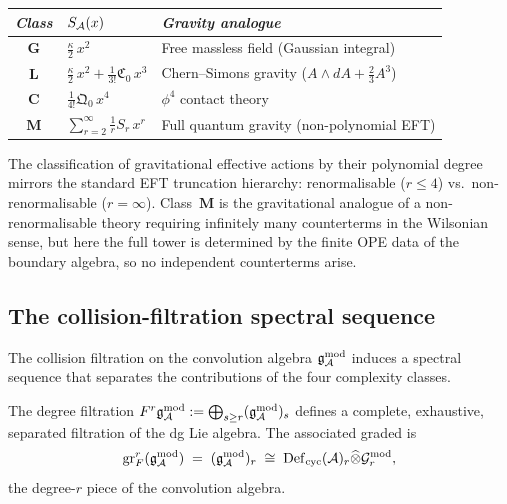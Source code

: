 \begin{remark}
\label{rem:thqg-four-gravity-theories}
\begin{center}
\small
\renewcommand{\arraystretch}{1.25}
\begin{tabular}{cll}
\toprule
\emph{Class} & $S_{\mathcal{A}}(x)$ &
\emph{Gravity analogue} \\
\midrule
$\mathbf{G}$ &
 $\frac{\kappa}{2}\,x^2$ &
 Free massless field (Gaussian integral) \\
$\mathbf{L}$ &
 $\frac{\kappa}{2}\,x^2 + \frac{1}{3!}\mathfrak{C}_0\,x^3$ &
 Chern--Simons gravity ($A\wedge dA + \frac{2}{3}A^3$) \\
$\mathbf{C}$ &
 $\frac{1}{4!}\mathfrak{Q}_0\,x^4$ &
 $\phi^4$ contact theory \\
$\mathbf{M}$ &
 $\sum_{r=2}^\infty \frac{1}{r}S_r\,x^r$ &
 Full quantum gravity (non-polynomial EFT) \\
\bottomrule
\end{tabular}
\end{center}
The classification of gravitational effective actions
by their polynomial degree mirrors the standard EFT
truncation hierarchy: renormalisable ($r \leq 4$) vs.\
non-renormalisable ($r = \infty$). Class~$\mathbf{M}$
is the gravitational analogue of a non-renormalisable
theory requiring infinitely many counterterms in the
Wilsonian sense, but here the full tower is determined
by the finite OPE data of the boundary algebra, so no
independent counterterms arise.
\end{remark}



\subsection{The collision-filtration spectral sequence}
\label{subsec:thqg-holographic-ss}

The collision filtration on the convolution algebra
$\mathfrak{g}_{\mathcal{A}}^{\mathrm{mod}}$ induces a spectral sequence that separates the
contributions of the four complexity classes.

\begin{construction}
\label{constr:thqg-collision-filtration}
The degree filtration
$F^r\mathfrak{g}_{\mathcal{A}}^{\mathrm{mod}} := \bigoplus_{s \geq r}(\mathfrak{g}_{\mathcal{A}}^{\mathrm{mod}})_s$
defines a complete, exhaustive, separated filtration
of the dg Lie algebra. The associated graded is
\begin{equation}\label{eq:thqg-graded-convolution}
\operatorname{gr}^r_F(\mathfrak{g}_{\mathcal{A}}^{\mathrm{mod}})
\;=\;
(\mathfrak{g}_{\mathcal{A}}^{\mathrm{mod}})_r
\;\cong\;
\mathrm{Def}_{\mathrm{cyc}}(\mathcal{A})_r \widehat\otimes \mathcal{G}^{\mathrm{mod}}_r,
\end{equation}
the degree-$r$ piece of the convolution algebra.
\end{construction}

